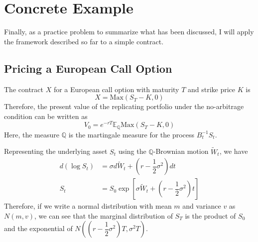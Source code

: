 \documentclass[uplatex,a4j,12pt,dvipdfmx]{jsarticle}
\begin{document}
\section{Concrete Example}
Finally, as a practice problem to summarize what has been discussed, I will apply the framework described so far to a simple contract.

\subsection{Pricing a European Call Option}
The contract $X$ for a European call option with maturity $T$ and strike price $K$ is
$$ X = \mathrm{Max}(S_{T} - K,0) $$
Therefore, the present value of the replicating portfolio under the no-arbitrage condition can be written as
$$ V_{0} = e^{-rT} \mathbb{E}_{\mathbb{Q}} \mathrm{Max}(S_{T} - K,0) $$
Here, the measure $\mathbb{Q}$ is the martingale measure for the process $B^{-1}_{t} S_{t}$.

Representing the underlying asset $S_{t}$ using the $\mathbb{Q}$-Brownian motion $\tilde{W}_{t}$, we have
\begin{align*}
	d(\log S_{t}) & = \sigma d \tilde{W}_{t} + \left( r - \dfrac{1}{2} \sigma^{2} \right) dt \\
	S_{t} & = S_{0} \exp \left[ \sigma \tilde{W}_{t} + \left( r - \dfrac{1}{2} \sigma^{2} \right) t \right]
\end{align*}
Therefore, if we write a normal distribution with mean $m$ and variance $v$ as $N(m,v)$, we can see that the marginal distribution of $S_{T}$ is the product of $S_{0}$ and the exponential of $N \left( \left( r - \dfrac{1}{2} \sigma^{2} \right) T , \sigma^{2} T \right)$.
\end{document}
